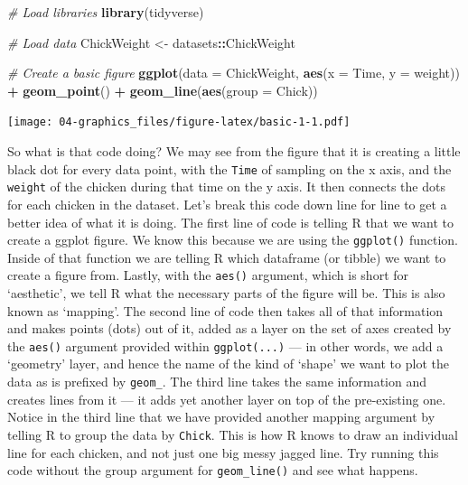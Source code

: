 \documentclass[]{book}
\newenvironment{Shaded}{\begin{snugshade}}{\end{snugshade}}
\newcommand{\KeywordTok}[1]{\textcolor[rgb]{0.13,0.29,0.53}{\textbf{#1}}}
\newcommand{\DataTypeTok}[1]{\textcolor[rgb]{0.13,0.29,0.53}{#1}}
\newcommand{\StringTok}[1]{\textcolor[rgb]{0.31,0.60,0.02}{#1}}
\newcommand{\CommentTok}[1]{\textcolor[rgb]{0.56,0.35,0.01}{\textit{#1}}}
\newcommand{\OperatorTok}[1]{\textcolor[rgb]{0.81,0.36,0.00}{\textbf{#1}}}
\newcommand{\NormalTok}[1]{#1}
\theoremstyle{definition}
\theoremstyle{definition}
\theoremstyle{definition}
\theoremstyle{remark}
\begin{document}
\begin{Shaded}
\begin{Highlighting}[]
\CommentTok{# Load libraries}
\KeywordTok{library}\NormalTok{(tidyverse)}

\CommentTok{# Load data}
\NormalTok{ChickWeight <-}\StringTok{ }\NormalTok{datasets}\OperatorTok{::}\NormalTok{ChickWeight}

\CommentTok{# Create a basic figure}
\KeywordTok{ggplot}\NormalTok{(}\DataTypeTok{data =}\NormalTok{ ChickWeight, }\KeywordTok{aes}\NormalTok{(}\DataTypeTok{x =}\NormalTok{ Time, }\DataTypeTok{y =}\NormalTok{ weight)) }\OperatorTok{+}
\StringTok{  }\KeywordTok{geom_point}\NormalTok{() }\OperatorTok{+}
\StringTok{  }\KeywordTok{geom_line}\NormalTok{(}\KeywordTok{aes}\NormalTok{(}\DataTypeTok{group =}\NormalTok{ Chick))}
\end{Highlighting}
\end{Shaded}

\texttt{[image: 04-graphics\_files/figure-latex/basic-1-1.pdf]}

So what is that code doing? We may see from the figure that it is
creating a little black dot for every data point, with the \texttt{Time}
of sampling on the x axis, and the \texttt{weight} of the chicken during
that time on the y axis. It then connects the dots for each chicken in
the dataset. Let's break this code down line for line to get a better
idea of what it is doing. The first line of code is telling R that we
want to create a ggplot figure. We know this because we are using the
\texttt{ggplot()} function. Inside of that function we are telling R
which dataframe (or tibble) we want to create a figure from. Lastly,
with the \texttt{aes()} argument, which is short for `aesthetic', we
tell R what the necessary parts of the figure will be. This is also
known as `mapping'. The second line of code then takes all of that
information and makes points (dots) out of it, added as a layer on the
set of axes created by the \texttt{aes()} argument provided within
\texttt{ggplot(...)} --- in other words, we add a `geometry' layer, and
hence the name of the kind of `shape' we want to plot the data as is
prefixed by \texttt{geom\_}. The third line takes the same information
and creates lines from it --- it adds yet another layer on top of the
pre-existing one. Notice in the third line that we have provided another
mapping argument by telling R to group the data by \texttt{Chick}. This
is how R knows to draw an individual line for each chicken, and not just
one big messy jagged line. Try running this code without the group
argument for \texttt{geom\_line()} and see what happens.
\end{document}
